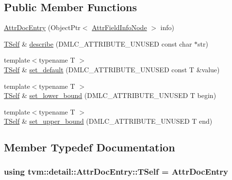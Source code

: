 \subsection*{Public Member Functions}
\begin{DoxyCompactItemize}
\item 
\hyperlink{classtvm_1_1detail_1_1AttrDocEntry_ad364f21d28cf391fcfd8dc2364d88f89}{Attr\+Doc\+Entry} (Object\+Ptr$<$ \hyperlink{classtvm_1_1AttrFieldInfoNode}{Attr\+Field\+Info\+Node} $>$ info)
\item 
\hyperlink{classtvm_1_1detail_1_1AttrDocEntry_a8bab3adf8242c94bd163ab7484170a5d}{T\+Self} \& \hyperlink{classtvm_1_1detail_1_1AttrDocEntry_a8b5f78f95056953d0460740f916c8e6c}{describe} (D\+M\+L\+C\+\_\+\+A\+T\+T\+R\+I\+B\+U\+T\+E\+\_\+\+U\+N\+U\+S\+ED const char $\ast$str)
\item 
{\footnotesize template$<$typename T $>$ }\\\hyperlink{classtvm_1_1detail_1_1AttrDocEntry_a8bab3adf8242c94bd163ab7484170a5d}{T\+Self} \& \hyperlink{classtvm_1_1detail_1_1AttrDocEntry_ae42cd45d8f626450cfcfa35b9849f1e3}{set\+\_\+default} (D\+M\+L\+C\+\_\+\+A\+T\+T\+R\+I\+B\+U\+T\+E\+\_\+\+U\+N\+U\+S\+ED const T \&value)
\item 
{\footnotesize template$<$typename T $>$ }\\\hyperlink{classtvm_1_1detail_1_1AttrDocEntry_a8bab3adf8242c94bd163ab7484170a5d}{T\+Self} \& \hyperlink{classtvm_1_1detail_1_1AttrDocEntry_a201e9d6c937d2f444d91fcc8185f8309}{set\+\_\+lower\+\_\+bound} (D\+M\+L\+C\+\_\+\+A\+T\+T\+R\+I\+B\+U\+T\+E\+\_\+\+U\+N\+U\+S\+ED T begin)
\item 
{\footnotesize template$<$typename T $>$ }\\\hyperlink{classtvm_1_1detail_1_1AttrDocEntry_a8bab3adf8242c94bd163ab7484170a5d}{T\+Self} \& \hyperlink{classtvm_1_1detail_1_1AttrDocEntry_aec039b071d826ab164c5abe123aefaa3}{set\+\_\+upper\+\_\+bound} (D\+M\+L\+C\+\_\+\+A\+T\+T\+R\+I\+B\+U\+T\+E\+\_\+\+U\+N\+U\+S\+ED T end)
\end{DoxyCompactItemize}


\subsection{Member Typedef Documentation}
\subsubsection[{\texorpdfstring{T\+Self}{TSelf}}]{\setlength{\rightskip}{0pt plus 5cm}using {\bf tvm\+::detail\+::\+Attr\+Doc\+Entry\+::\+T\+Self} =  {\bf Attr\+Doc\+Entry}}\hypertarget{classtvm_1_1detail_1_1AttrDocEntry_a8bab3adf8242c94bd163ab7484170a5d}{}\label{classtvm_1_1detail_1_1AttrDocEntry_a8bab3adf8242c94bd163ab7484170a5d}


